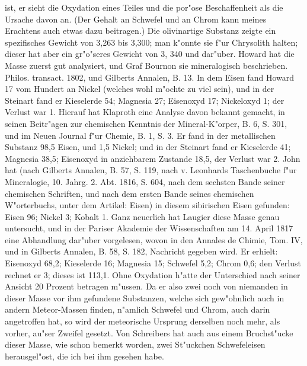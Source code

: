 \documentclass[a4paper, 11pt, oneside, polutonikogreek, german]{article}
\begin{document}
ist, er sieht die Oxydation eines Teiles und die por"ose Beschaffenheit als die Ursache davon an. (Der Gehalt an Schwefel und an Chrom kann meines Erachtens auch etwas dazu beitragen.) Die olivinartige Substanz zeigte ein spezifisches Gewicht von 3,263 bis 3,300; man k"onnte sie f"ur Chrysolith halten; dieser hat aber ein gr"o"seres Gewicht von 3, 340 und dar"uber. Howard hat die Masse zuerst gut analysiert, und Graf Bournon sie mineralogisch beschrieben. Philos. transact. 1802, und Gilberts Annalen, B. 13. In dem Eisen fand Howard 17 vom Hundert an Nickel (welches wohl m"ochte zu viel sein), und in der Steinart fand er Kieselerde 54; Magnesia 27; Eisenoxyd 17; Nickeloxyd 1; der Verlust war 1. Hierauf hat Klaproth eine Analyse davon bekannt gemacht, in seinen Beitr"agen zur chemischen Kenntnis der Mineral-K"orper, B. 6, S. 301, und im Neuen Journal f"ur Chemie, B. 1, S. 3. Er fand in der metallischen Substanz 98,5 Eisen, und 1,5 Nickel; und in der Steinart fand er Kieselerde 41; Magnesia 38,5; Eisenoxyd in anziehbarem Zustande 18,5, der Verlust war 2. John hat (nach Gilberts Annalen, B. 57, S. 119, nach v. Leonhards Taschenbuche f"ur Mineralogie, 10. Jahrg. 2. Abt. 1816, S. 604, nach dem sechsten Bande seiner chemischen Schriften, und nach dem ersten Bande seines chemischen W"orterbuchs, unter dem Artikel: Eisen) in diesem sibirischen Eisen gefunden: Eisen 96; Nickel 3; Kobalt 1. Ganz neuerlich hat Laugier diese Masse genau untersucht, und in der Pariser Akademie der Wissenschaften am 14. April 1817 eine Abhandlung dar"uber vorgelesen, wovon in den Annales de Chimie, Tom. IV, und in Gilberts Annalen, B. 58, S. 182, Nachricht gegeben wird. Er erhielt: Eisenoxyd 68,2; Kieselerde 16; Magnesia 15; Schwefel 5,2; Chrom 0,6; den Verlust rechnet er 3; dieses ist 113,1. Ohne Oxydation h"atte der Unterschied nach seiner Ansicht 20 Prozent betragen m"ussen. Da er also zwei noch von niemanden in dieser Masse vor ihm gefundene Substanzen, welche sich gew"ohnlich auch in andern Meteor-Massen finden, n"amlich Schwefel und Chrom, auch darin angetroffen hat, so wird der meteorische Ursprung derselben noch mehr, als vorher, au"ser Zweifel gesetzt. Von Schreibers hat auch aus einem Bruchst"ucke dieser Masse, wie schon bemerkt worden, zwei St"uckchen Schwefeleisen herausgel"ost, die ich bei ihm gesehen habe.
\end{document}
